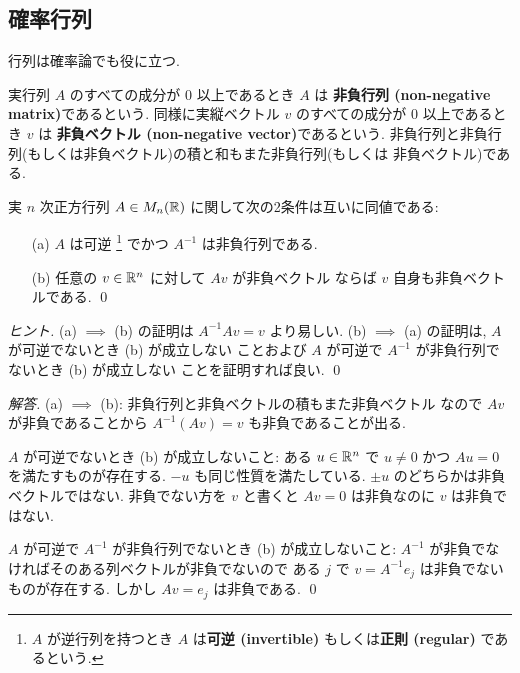 \documentclass[12pt,twoside]{jarticle}
\newcommand\commentout[1]{#1}
\newcommand\commentout[1]{}
\begin{document}

\subsection{確率行列}
\label{sec:stochastic-matrix}

行列は確率論でも役に立つ.

実行列 $A$ のすべての成分が $0$ 以上であるとき $A$ は
{\bf 非負行列 (non-negative matrix)}であるという.
同様に実縦ベクトル $v$ のすべての成分が $0$ 以上であるとき $v$ は
{\bf 非負ベクトル (non-negative vector)}であるという.
非負行列と非負行列(もしくは非負ベクトル)の積と和もまた非負行列(もしくは
非負ベクトル)である. 

\begin{question}
  \label{q:non-neg-mat-1}
  実 $n$ 次正方行列 $A\in M_n({\mathbb R})$ に関して次の2条件は互いに同値である:
  \begin{itemize}
  \item[(a)] $A$ は可逆%
    \footnote{$A$ が逆行列を持つとき $A$ は{\bf 可逆 (invertible)} 
      もしくは{\bf 正則 (regular)} であるという.}%
    でかつ $A^{-1}$ は非負行列である.
  \item[(b)] 任意の $v\in{\mathbb R}^n$ に対して $Av$ が非負ベクトル
    ならば $v$ 自身も非負ベクトルである.
    \qed
  \end{itemize}
\end{question}

\begin{proof}[ヒント]
(a) $\implies$ (b) の証明は $A^{-1}Av = v$ より易しい.
(b) $\implies$ (a) の証明は, $A$ が可逆でないとき (b) が成立しない
ことおよび $A$ が可逆で $A^{-1}$ が非負行列でないとき (b) が成立しない
ことを証明すれば良い. \qed
\end{proof}

\commentout{
\begin{proof}[解答]
  (a) $\implies$ (b): 非負行列と非負ベクトルの積もまた非負ベクトル
  なので $Av$ が非負であることから $A^{-1}(Av)=v$ も非負であることが出る.

  $A$ が可逆でないとき (b) が成立しないこと: 
  ある $u\in{\mathbb R}^n$ で $u\ne 0$ かつ $Au = 0$ を満たすものが存在する.  
  $-u$ も同じ性質を満たしている. $\pm u$ のどちらかは非負ベクトルではない. 
  非負でない方を $v$ と書くと $Av=0$ は非負なのに $v$ は非負ではない.

  $A$ が可逆で $A^{-1}$ が非負行列でないとき (b) が成立しないこと:
  $A^{-1}$ が非負でなければそのある列ベクトルが非負でないので
  ある $j$ で $v=A^{-1}e_j$ は非負でないものが存在する.
  しかし $Av = e_j$ は非負である.
  \qed
\end{proof}
}
\end{document}
